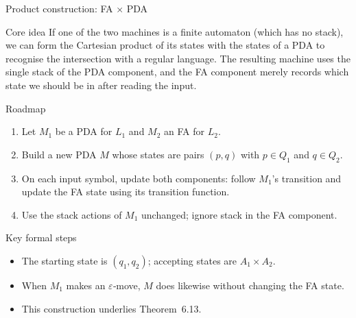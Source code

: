\begin{frame}[t]{Product construction: FA × PDA}
  \begin{tblock}{Core idea}
    If one of the two machines is a finite automaton (which has no
    stack), we can form the Cartesian product of its states with the
    states of a PDA to recognise the intersection with a regular
    language.  The resulting machine uses the single stack of the PDA
    component, and the FA component merely records which state we
    should be in after reading the input.
  \end{tblock}
  \begin{tblock}{Roadmap}
    \begin{enumerate}
      \item Let $M_1$ be a PDA for $L_1$ and $M_2$ an FA for $L_2$.
      \item Build a new PDA $M$ whose states are pairs $(p,q)$ with
        $p \in Q_1$ and $q \in Q_2$.
      \item On each input symbol, update both components: follow
        $M_1$’s transition and update the FA state using its transition
        function.
      \item Use the stack actions of $M_1$ unchanged; ignore stack in
        the FA component.
    \end{enumerate}
  \end{tblock}
  \begin{tblock}{Key formal steps}
    \begin{itemize}
      \item The starting state is $(q_1,q_2)$; accepting states are
        $A_1 \times A_2$.
      \item When $M_1$ makes an $\varepsilon$‑move, $M$ does likewise
        without changing the FA state.
      \item This construction underlies Theorem 6.13.
    \end{itemize}
  \end{tblock}
  \label{fr:6.2-13}
\end{frame}

